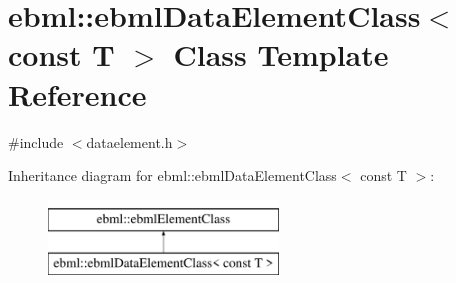 \hypertarget{classebml_1_1ebmlDataElementClass_3_01const_01T_01_4}{}\section{ebml\+:\+:ebml\+Data\+Element\+Class$<$ const T $>$ Class Template Reference}
\label{classebml_1_1ebmlDataElementClass_3_01const_01T_01_4}


{\ttfamily \#include $<$dataelement.\+h$>$}

Inheritance diagram for ebml\+:\+:ebml\+Data\+Element\+Class$<$ const T $>$\+:\begin{figure}[H]
\begin{center}
\leavevmode
\includegraphics[height=2.000000cm]{classebml_1_1ebmlDataElementClass_3_01const_01T_01_4}
\end{center}
\end{figure}
